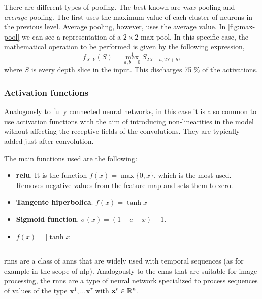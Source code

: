 There are different types of pooling. The best known are \emph{max} pooling and
\emph{average} pooling. The first uses the maximum value of each cluster of
neurons in the previous level. Average pooling, however, uses the average
value. In \vref{fig:max-pool} we can see a representation of a \(2 \times 2\)
max-pool. In this specific case, the mathematical operation to be performed is
given by the following expression,
\begin{equation}
  f_{X,Y}(S) = \max _{a,b=0}^{1}S_{2X+a,2Y+b},
\end{equation}
where \(S\) is every depth slice in the input. This discharges 75 \% of the
activations.

\subsubsection{Activation functions}

Analogously to fully connected neural networks, in this case it is also common
to use activation functions with the aim of introducing non-linearities in the
model without affecting the receptive fields of the convolutions. They are
typically added just after convolution.

The main functions used are the following:
\begin{itemize}
  \item \textbf{\gls*{relu}}. It is the function \(f (x) = \max \{0, x\}\),
  which is the most used. Removes negative values from the feature map and sets
  them to zero.
  \item \textbf{Tangente hiperbolica}. \(f (x) = \tanh x\)
  \item \textbf{Sigmoid function}. \(\sigma (x) ={(1 + e - x)} -1\).
  \item \(f (x) = | \tanh x |\)
\end{itemize}


\subsection{}\label{sec:rnn}

\glspl{rnn} are a class of \glspl{ann} that are widely used with temporal
sequences (as for example in the scope of \gls{nlp}). Analogously to the
\glspl{cnn} that are suitable for image processing, the \glspl{rnn} are a type
of neural network specialized to process sequences of values of the type
\(\mathbf{x}^1, \ldots \mathbf{x}^{\tau}\) with \(\mathbf{x}^t \in \mathbb{R}^n\).

